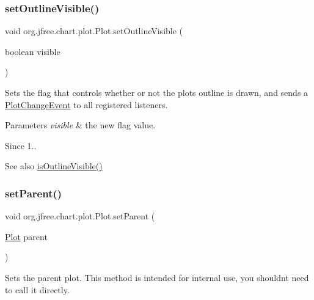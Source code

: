 \subsubsection{\texorpdfstring{set\+Outline\+Visible()}{setOutlineVisible()}}
{\footnotesize\ttfamily void org.\+jfree.\+chart.\+plot.\+Plot.\+set\+Outline\+Visible (\begin{DoxyParamCaption}\item[{boolean}]{visible }\end{DoxyParamCaption})}

Sets the flag that controls whether or not the plot\textquotesingle{}s outline is drawn, and sends a \mbox{\hyperlink{}{Plot\+Change\+Event}} to all registered listeners.


\begin{DoxyParams}{Parameters}
{\em visible} & the new flag value.\\
\hline
\end{DoxyParams}
\begin{DoxySince}{Since}
1..
\end{DoxySince}
\begin{DoxySeeAlso}{See also}
\mbox{\hyperlink{classorg_1_1jfree_1_1chart_1_1plot_1_1_plot_a52723c31418d363029e8b59b6cd43711}{is\+Outline\+Visible()}} 
\end{DoxySeeAlso}
\mbox{\label{classorg_1_1jfree_1_1chart_1_1plot_1_1_plot_afdbfc2dc3e4eafa1fb53b699bc8e088d}} 
\subsubsection{\texorpdfstring{set\+Parent()}{setParent()}}
{\footnotesize\ttfamily void org.\+jfree.\+chart.\+plot.\+Plot.\+set\+Parent (\begin{DoxyParamCaption}\item[{\mbox{\hyperlink{classorg_1_1jfree_1_1chart_1_1plot_1_1_plot}{Plot}}}]{parent }\end{DoxyParamCaption})}

Sets the parent plot. This method is intended for internal use, you shouldn\textquotesingle{}t need to call it directly.


